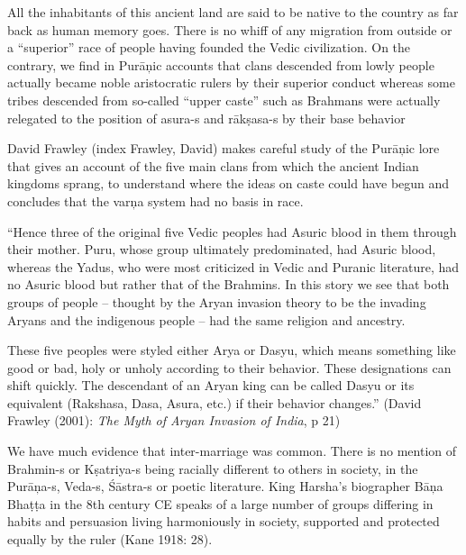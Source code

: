 All the inhabitants of this ancient land are said to be native to the country as far back as human memory goes. There is no whiff of any migration from outside or a “superior” race of people having founded the Vedic civilization. On the contrary, we find in Purāņic accounts that clans descended from lowly people actually became noble aristocratic rulers by their superior conduct whereas some tribes descended from so-called “upper caste” such as Brahmans were actually relegated to the position of asura-s and rākṣasa-s by their base behavior

David Frawley (index Frawley, David) makes careful study of the Purāņic lore that gives an account of the five main clans from which the ancient Indian kingdoms sprang, to understand where the ideas on caste could have begun and concludes that the varņa system had no basis in race.

\begin{myquote}
“Hence three of the original five Vedic peoples had Asuric blood in them through their mother. Puru, whose group ultimately predominated, had Asuric blood, whereas the Yadus, who were most criticized in Vedic and Puranic literature, had no Asuric blood but rather that of the Brahmins. In this story we see that both groups of people – thought by the Aryan invasion theory to be the invading Aryans and the indigenous people – had the same religion and ancestry.
\end{myquote}

\begin{myquote}
These five peoples were styled either Arya or Dasyu, which means something like good or bad, holy or unholy according to their behavior. These designations can shift quickly. The descendant of an Aryan king can be called Dasyu or its equivalent (Rakshasa, Dasa, Asura, etc.) if their behavior changes.” (David Frawley (2001): \textit{The Myth of Aryan Invasion of India}, p 21)
\end{myquote}

We have much evidence that inter-marriage was common. There is no mention of Brahmin-s or Kṣatriya-s being racially different to others in society, in the Purāņa-s, Veda-s, Śāstra-s or poetic literature. King Harsha’s biographer Bāņa Bhaṭṭa in the 8th century CE speaks of a large number of groups differing in habits and persuasion living harmoniously in society, supported and protected equally by the ruler (Kane 1918: 28).

